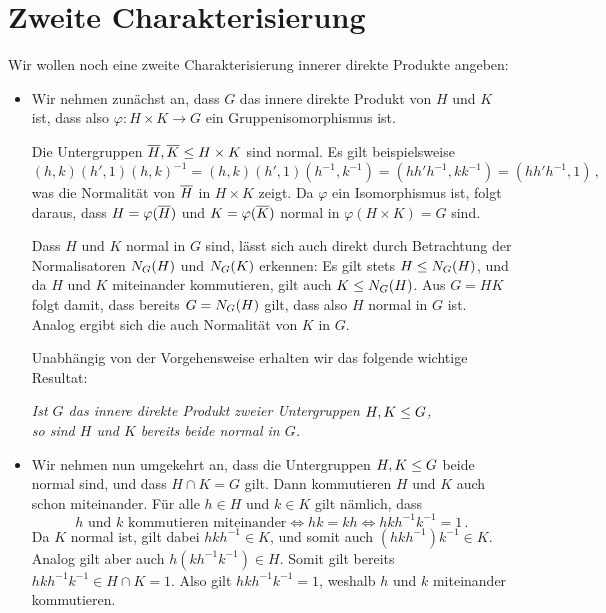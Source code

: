 \section{Zweite Charakterisierung}

Wir wollen noch eine zweite Charakterisierung innerer direkte Produkte angeben:

\begin{itemize}
  \item
    Wir nehmen zunächst an, dass $G$ das innere direkte Produkt von $H$ und $K$ ist, dass also $\varphi \colon H \times K \to G$ ein Gruppenisomorphismus ist.
    
    Die Untergruppen $\induced{H}, \induced{K} \subgroup H \times K$ sind normal.
    Es gilt beispielsweise
    \[
          (h, k) (h', 1) (h, k)^{-1}
      =   (h, k) (h', 1) (h^{-1}, k^{-1})
      =   (h h' h^{-1}, k k^{-1})
      =   (h h' h^{-1}, 1) \,,
    \]
    was die Normalität von $\induced{H}$ in $H \times K$ zeigt.
    Da $\varphi$ ein Isomorphismus ist, folgt daraus, dass $H = \varphi(\induced{H})$ und $K = \varphi(\induced{K})$ normal in $\varphi(H \times K) = G$ sind.
    
    Dass $H$ und $K$ normal in $G$ sind, lässt sich auch direkt durch Betrachtung der Normalisatoren $\normalizer{H}{G}$ und $\normalizer{K}{G}$ erkennen:
    Es gilt stets $H \subgroup \normalizer{H}{G}$, und da $H$ und $K$ miteinander kommutieren, gilt auch $K \subgroup \normalizer{H}{G}$.
    Aus $G = HK$ folgt damit, dass bereits $G = \normalizer{H}{G}$ gilt, dass also $H$ normal in $G$ ist.
    Analog ergibt sich die auch Normalität von $K$ in $G$.
    
    Unabhängig von der Vorgehensweise erhalten wir das folgende wichtige Resultat:
    \begin{center}
      \emph{
      Ist $G$ das innere direkte Produkt zweier Untergruppen $H, K \subgroup G$,\\
      so sind $H$ und $K$ bereits beide normal in $G$.
      }
    \end{center}
  \item
    Wir nehmen nun umgekehrt an, dass die Untergruppen $H, K \subgroup G$ beide normal sind, und dass $H \cap K = G$ gilt.
    Dann kommutieren $H$ und $K$ auch schon miteinander.
    Für alle $h \in H$ und $k \in K$ gilt nämlich, dass
    \[
            \text{$h$ und $k$ kommutieren miteinander}
      \iff  hk = kh
      \iff  h k h^{-1} k^{-1} = 1 \,.
    \]
    Da $K$ normal ist, gilt dabei $h k h^{-1} \in K$, und somit auch $(h k h^{-1}) k^{-1} \in K$.
    Analog gilt aber auch $h (k h^{-1} k^{-1}) \in H$.
    Somit gilt bereits $h k h^{-1} k^{-1} \in H \cap K = 1$.
    Also gilt $h k h^{-1} k^{-1} = 1$, weshalb $h$ und $k$ miteinander kommutieren.
\end{itemize}


